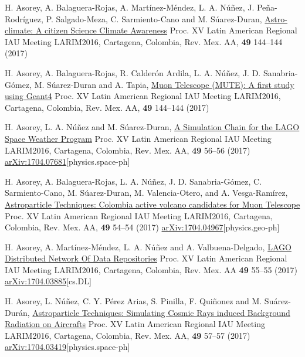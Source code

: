 \begin{etaremune}
\item {} H. Asorey, A. Balaguera-Rojas, A. Martínez-Méndez, L. A. Núñez, J. Peña-Rodríguez, P. Salgado-Meza, C. Sarmiento-Cano and M. Súarez-Duran, \href{http://www.astroscu.unam.mx/rmaa/RMxAC..49/PDF/RMxAC..49\_poster2.pdf}{{Astro-climate: A citizen Science Climate Awareness}} \en Proc.
XV Latin American Regional IAU Meeting LARIM2016, Cartagena, Colombia, Rev.
Mex.
AA, {\textbf{49}} 144--144 (2017)

\item {} H. Asorey, A. Balaguera-Rojas, R. Calderón Ardila, L. A. Núñez, J. D. Sanabria-Gómez, M. Súarez-Duran and A. Tapia, \href{http://www.astroscu.unam.mx/rmaa/RMxAC..49/PDF/RMxAC..49\_poster2.pdf}{{Muon Telescope (MUTE): A first study using Geant4}} \en Proc.
XV Latin American Regional IAU Meeting LARIM2016, Cartagena, Colombia, Rev.
Mex.
AA, {\textbf{49}} 144--144 (2017)

\item {} H. Asorey, L. A. Núñez and M. Súarez-Duran, \href{http://www.astroscu.unam.mx/rmaa/RMxAC..49/PDF/RMxAC..49\_oral6.pdf}{{A Simulation Chain for the LAGO Space Weather Program}} \en Proc.
XV Latin American Regional IAU Meeting LARIM2016, Cartagena, Colombia, Rev.
Mex.
AA, {\textbf{49}} 56--56 (2017) \href{http://arxiv.org/abs/1704.07681}{arXiv:1704.07681}[physics.space-ph]

\item {} H. Asorey, A. Balaguera-Rojas, L. A. Núñez, J. D. Sanabria-Gómez, C. Sarmiento-Cano, M. Súarez-Duran, M. Valencia-Otero, and A. Vesga-Ramírez, \href{http://www.astroscu.unam.mx/rmaa/RMxAC..49/PDF/RMxAC..49\_oral4.pdf}{{Astroparticle Techniques: Colombia active volcano candidates for Muon Telescope}} \en Proc.
XV Latin American Regional IAU Meeting LARIM2016, Cartagena, Colombia, Rev.
Mex.
AA, {\textbf{49}} 54--54 (2017) \href{http://arxiv.org/abs/1704.04967}{arXiv:1704.04967}[physics.geo-ph]

\item {}H. Asorey, A. Martínez-Méndez, L. A. Núñez and A. Valbuena-Delgado, \href{http://www.astroscu.unam.mx/rmaa/RMxAC..49/PDF/RMxAC..49\_oral5.pdf}{{LAGO Distributed Network Of Data Repositories}} \en Proc.
XV Latin American Regional IAU Meeting LARIM2016, Cartagena, Colombia, Rev.
Mex.
AA {\textbf{49}} 55--55 (2017) \href{http://arxiv.org/abs/1704.03885}{arXiv:1704.03885}[cs.DL]

\item {}H. Asorey, L. Núñez, C. Y. Pérez Arias, S. Pinilla, F. Quiñonez and M. Suárez-Durán, \href{http://www.astroscu.unam.mx/rmaa/RMxAC..49/PDF/RMxAC..49\_oral7.pdf}{{Astroparticle Techniques: Simulating Cosmic Rays induced Background Radiation on Aircrafts}} \en Proc.
XV Latin American Regional IAU Meeting LARIM2016, Cartagena, Colombia, Rev.
Mex.
AA, {\textbf{49}} 57--57 (2017) \href{http://arxiv.org/abs/1704.03419}{arXiv:1704.03419}[physics.space-ph]


\end{etaremune}
